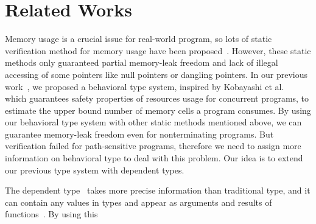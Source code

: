 \section{Related Works}\label{sec:relatedwork}

Memory usage is a crucial issue for real-world program, so lots of
static verification method for memory usage have been
proposed~\cite{DBLP:conf/aplas/SuenagaK09,DBLP:conf/pldi/HeineL03,DBLP:conf/sigsoft/XieA05,DBLP:journals/scp/SwamyHMGJ06,DBLP:conf/sas/OrlovichR06,DBLP:conf/issta/SuiYX12}. However,
these static methods only guaranteed partial memory-leak freedom and
lack of illegal accessing of some pointers like null pointers or
dangling pointers.  In our previous work~\cite{}, we proposed a
behavioral type system, inspired by Kobayashi et
al.~\cite{DBLP:journals/lmcs/KobayashiSW06} which guarantees safety
properties of resources usage for concurrent programs, to estimate the
upper bound number of memory cells a program consumes.  By using our
behavioral type system with other static methods mentioned above, we
can guarantee memory-leak freedom even for nonterminating
programs. But verification failed for path-sensitive programs,
therefore we need to assign more information on behavioral type to
deal with this problem. Our idea is to extend our previous type system
with dependent types.

The dependent type~\cite{DBLP:conf/popl/XiP99,DBLP:conf/pldi/XiP98}
takes more precise information than traditional type, and it can
contain any values in types and appear as arguments and results of
functions~\cite{DBLP:conf/tldi/Norell09}. By using this 
